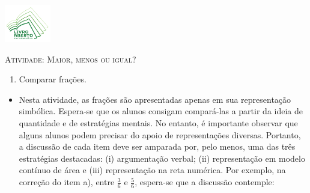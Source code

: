 \documentclass[10 pt,usenames,dvipsnames, oneside]{article}
\begin{document}
\begin{center}
  \begin{minipage}[l]{3cm}
\includegraphics[width=2cm]{../../../Figuras/logo}       
\end{minipage}\hfill
\begin{minipage}[r]{.8\textwidth}
 {\Large \scshape Atividade: Maior, menos ou igual?}  
\end{minipage}
\end{center}
\vspace{.2cm}

\ifdefined\prof
\begin{goals}
\begin{enumerate}
\item Comparar frações.
\end{enumerate}

\tcblower

\begin{itemize}
  \item Nesta atividade, as frações são apresentadas apenas em sua representação simbólica. Espera-se que os alunos consigam compará-las a partir da ideia de quantidade e de estratégias mentais. No entanto, é importante observar que alguns alunos podem precisar do apoio de representações diversas. Portanto, a discussão de cada item deve ser amparada por, pelo menos, uma das três estratégias destacadas: (i) argumentação verbal; (ii) representação em modelo contínuo de área e (iii) representação na reta numérica. Por exemplo, na correção do item a), entre $\frac{3}{6}$ e $\frac{5}{6}$, espera-se que a discussão contemple:


\end{itemize}
\end{goals}
\end{document}
